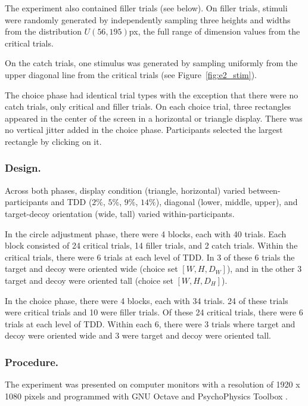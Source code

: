 The experiment also contained filler trials (see below). On filler trials, stimuli were randomly generated by independently sampling three heights and widths from the distribution $U(56,195)$px, the full range of dimension values from the critical trials.

On the catch trials, one stimulus was generated by sampling uniformly from the upper diagonal line from the critical trials (see Figure~\ref{fig:e2_stim}).

The choice phase had identical trial types with the exception that there were no catch trials, only critical and filler trials. On each choice trial, three rectangles appeared in the center of the screen in a horizontal or triangle display. There was no vertical jitter added in the choice phase. Participants selected the largest rectangle by clicking on it.


\subsubsection{Design.}
Across both phases, display condition (triangle, horizontal) varied between-participants and TDD ($2\%$, $5\%$, $9\%$, $14\%$), diagonal (lower, middle, upper), and target-decoy orientation (wide, tall) varied within-participants. 

In the circle adjustment phase, there were 4 blocks, each with 40 trials. Each block consisted of 24 critical trials, 14 filler trials, and 2 catch trials. Within the critical trials, there were 6 trials at each level of TDD. In 3 of these 6 trials the target and decoy were oriented wide (choice set $[W,H,D_{W}]$), and in the other 3 target and decoy were oriented tall (choice set $[W,H,D_{H}]$). 

In the choice phase, there were 4 blocks, each with 34 trials. 24 of these trials were critical trials and 10 were filler trials. Of these 24 critical trials, there were 6 trials at each level of TDD. Within each 6, there were 3 trials where target and decoy were oriented wide and 3 were target and decoy were oriented tall. 

\subsubsection{Procedure.}

The experiment was presented on computer monitors with a resolution of 1920 x 1080 pixels and programmed with GNU Octave \parencite{octave} and PsychoPhysics Toolbox \parencite{brainardPsychophysicsToolbox1997}. 

